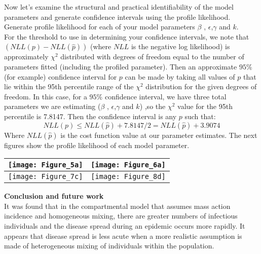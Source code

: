 \documentclass{exam}
\begin{document}
Now let's examine the structural and practical identifiability of the model parameters and generate confidence intervals using the profile likelihood. Generate profile likelihood for each of your model parameters $\beta$ , $\epsilon$,$\gamma$ and $k$.\\
For the threshold to use in determining your confidence intervals, we note that $(NLL(p)-NLL(\hat{p}))$ (where $NLL$ is the negative log likelihood) is approximately $\chi^2$ distributed with degrees of freedom equal to the number of parameters fitted (including the profiled parameter). Then an approximate $95 \% $ (for example) confidence interval for $p$ can be made by taking all values of $p$ that lie within the 95th percentile range of the $\chi^2$ distribution for the given degrees of freedom.
In this case, for a $95 \%$ confidence interval, we have three total parameters we are estimating ($\beta$ , $\epsilon$,$\gamma$ and $k$) ,so the $\chi^2$ value for the 95th percentile is 7.8147. Then the confidence interval is any $p$ such that:
\begin{equation*}
NLL(p) \leq NLL(\hat{p}) + 7.8147/2 =NLL(\hat{p}) +3.9074 
\end{equation*}
Where $NLL(\hat{p})$ is the cost function value at our parameter estimates.
The next figures show the profile likelihood of each model parameter.\\
	\begin{table}[h]
		\begin{tabular}{cc}			
			\texttt{[image: Figure\_5a]} &
			\texttt{[image: Figure\_6a]} \\
			\hline
			\texttt{[image: Figure\_7c]} &
			\texttt{[image: Figure\_8d]} \\
		\end{tabular}
\end{table}

\textbf{Conclusion and future work}\\

It was found that in the compartmental model that assumes mass action incidence and homogeneous
mixing, there are greater numbers of infectious individuals and the disease spread during an
epidemic occurs more rapidly. It appears that disease spread is less acute when a more realistic
assumption is made of heterogeneous mixing of individuals within the population.\\
\end{document}
